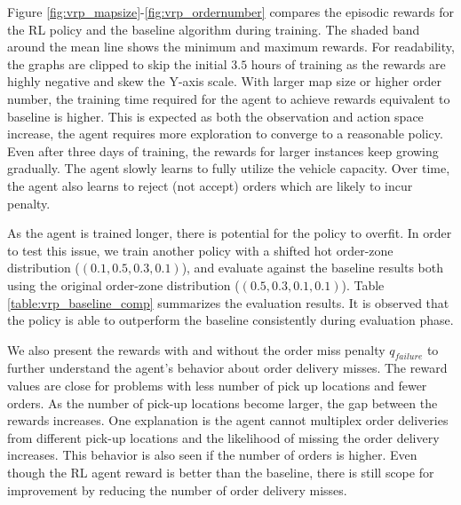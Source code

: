 Figure \ref{fig:vrp_mapsize}-\ref{fig:vrp_ordernumber} compares the episodic rewards for the RL policy and the baseline algorithm during training. The shaded band around the mean line shows the minimum and maximum rewards. For readability, the graphs are clipped to skip the initial $3.5$ hours of training as the rewards are highly negative and skew the Y-axis scale. With larger map size or higher order number, the training time required for the agent to achieve rewards equivalent to baseline is higher. This is expected as both the observation and action space increase, the agent requires more exploration to converge to a reasonable policy. Even after three days of training, the rewards for larger instances keep growing gradually. The agent slowly learns to fully utilize the vehicle capacity. Over time, the agent also learns to reject (not accept) orders which are likely to incur penalty. %

As the agent is trained longer, there is potential for the policy to overfit. In order to test this issue, we train another policy with a shifted hot order-zone distribution ($(0.1, 0.5, 0.3, 0.1)$), and evaluate against the baseline results both using the original order-zone distribution ($(0.5, 0.3, 0.1, 0.1)$). Table \ref{table:vrp_baseline_comp} summarizes the evaluation results. It is observed that the policy is able to outperform the baseline consistently during evaluation phase.

We also present the rewards with and without the order miss penalty $q_{failure}$ to further understand the agent's behavior about order delivery misses. The reward values are close for problems with less number of pick up locations and fewer orders. As the number of pick-up locations become larger, the gap between the rewards increases. One explanation is the agent cannot multiplex order deliveries from different pick-up locations and the likelihood of missing the order delivery increases. This behavior is also seen if the number of orders is higher. Even though the RL agent reward is better than the baseline, there is still scope for improvement by reducing the number of order delivery misses.

